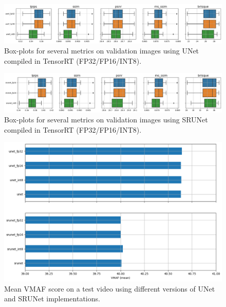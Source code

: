 \begin{figure}[ht]
\includegraphics[width=1.0\textwidth]{static/2023_03_02_boxplots_metrics_quant_UNet.png}
\caption{Box-plots for several metrics on validation images using UNet compiled in TensorRT (FP32/FP16/INT8).}
\label{fig:timings-unet}
\end{figure}

\begin{figure}[ht]
\includegraphics[width=1.0\textwidth]{static/2023_03_02_boxplots_metrics_quant_SRUNet.png}
\caption{Box-plots for several metrics on validation images using SRUNet compiled in TensorRT (FP32/FP16/INT8).}
\label{fig:timings-srunet}
\end{figure}

\begin{figure}[ht]
\includegraphics[width=1.0\textwidth]{static/2023_03_17_barplot_vmaf_mean.png}
\caption{Mean VMAF score on a test video using different versions of UNet and SRUNet implementations.}
\label{fig:vmaf-mean}
\end{figure}

